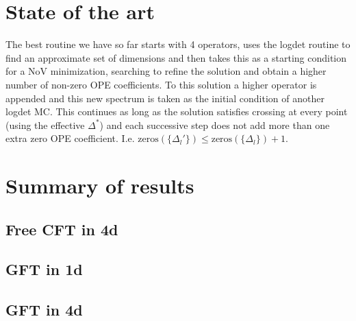 \documentclass[letterpaper]{article}
\numberwithin{equation}{section}
\begin{document}
\section{State of the art}
The best routine we have so far starts with 4 operators, uses the logdet routine
to find an approximate set of dimensions and then takes this as a starting
condition for a NoV minimization, searching to refine the solution and obtain a
higher number of non-zero OPE coefficients. To this solution a higher operator
is appended and this new spectrum is taken as the initial condition of another
logdet MC. This continues as long as the solution satisfies crossing at every
point (using the effective $\Delta^*$) and each successive step does not add
more than one extra zero OPE coefficient. I.e.
$\mathrm{zeros}(\{\Delta_l'\})\leq \mathrm{zeros}(\{\Delta_l\})+1$.

\section{Summary of results}
\subsection{Free CFT in 4d}
\subsection{GFT in 1d}
\subsection{GFT in 4d}
\end{document}
